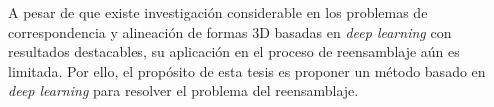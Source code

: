 A pesar de que existe investigación considerable en los problemas de correspondencia \cite{12} y alineación \cite{9} de formas 3D basadas en \textit{deep learning} con resultados destacables, su aplicación en el proceso de reensamblaje aún es limitada. Por ello, el propósito de esta tesis es proponer un método basado en \textit{deep learning} para resolver el problema del reensamblaje.
